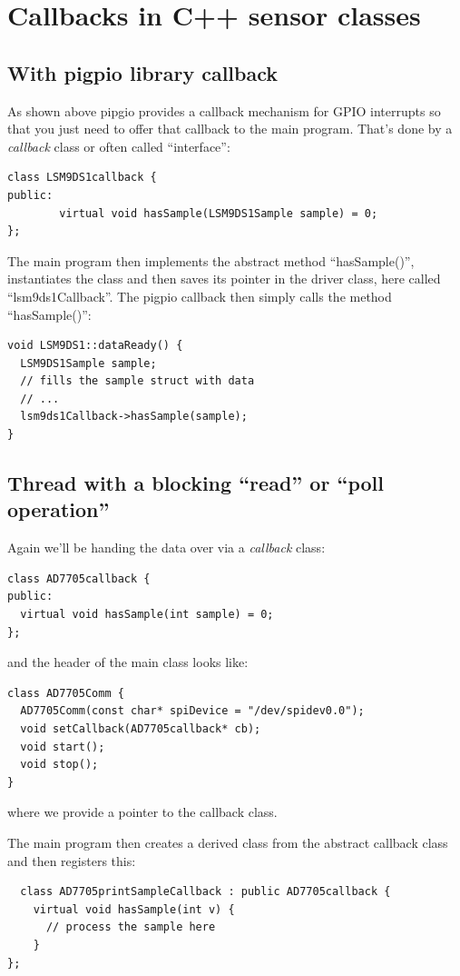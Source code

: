\documentclass[12pt]{report}
\begin{document}
\section{Callbacks in C++ sensor classes}
\subsection{With pigpio library callback}
As shown above pipgio provides a callback mechanism for GPIO interrupts
so that you just need
to offer that callback to the main program. That's done by a \textsl{callback}
class or often called ``interface'':
\begin{verbatim}
class LSM9DS1callback {
public:
        virtual void hasSample(LSM9DS1Sample sample) = 0;
};
\end{verbatim}

The main program then implements the abstract method ``hasSample()'', instantiates
the class and then saves its pointer in the driver class, here called ``lsm9ds1Callback''.
The pigpio callback then simply calls the method ``hasSample()'':
\begin{verbatim}
void LSM9DS1::dataReady() {
  LSM9DS1Sample sample;
  // fills the sample struct with data
  // ...
  lsm9ds1Callback->hasSample(sample);
}
\end{verbatim}

\subsection{Thread with a blocking ``read'' or ``poll operation''}
Again we'll be handing the data over via a \textsl{callback} class:
\begin{verbatim}
class AD7705callback {
public:
  virtual void hasSample(int sample) = 0;
};
\end{verbatim}

and the header of the main class looks like:
\begin{verbatim}
class AD7705Comm {
  AD7705Comm(const char* spiDevice = "/dev/spidev0.0");
  void setCallback(AD7705callback* cb);
  void start();
  void stop();
}
\end{verbatim}
where we provide a pointer to the callback class.

The main program then creates a derived class from the
abstract callback class and then registers this:
\begin{verbatim}
  class AD7705printSampleCallback : public AD7705callback {
    virtual void hasSample(int v) {
      // process the sample here
    }
};
\end{verbatim}
\end{document}
